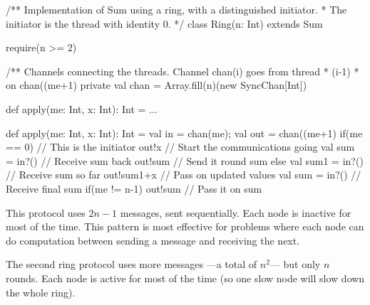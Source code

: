 \documentclass[notes,color]{sepslide0}
\begin{document}
\begin{slide}

\begin{scala}
/** Implementation of Sum using a ring, with a distinguished initiator.
  * The initiator is the thread with identity 0. */
class Ring(n: Int) extends Sum{
  require(n >= 2)

  /** Channels connecting the threads.  Channel chan(i) goes from thread
    * (i-1)%
    * on chan((me+1)%
  private val chan = Array.fill(n)(new SyncChan[Int])
 
  def apply(me: Int, x: Int): Int = ...
}
\end{scala}
\end{slide}


\begin{slide}

\begin{scala}
  def apply(me: Int, x: Int): Int = {
    val in = chan(me); val out = chan((me+1)%
    if(me == 0){                  // This is the initiator
      out!x                       // Start the communications going
      val sum = in?()             // Receive sum back
      out!sum                     // Send it round
      sum
    }
    else{
      val sum1 = in?()            // Receive sum so far
      out!sum1+x                  // Pass on updated values
      val sum = in?()             // Receive final sum
      if(me != n-1) out!sum   // Pass it on
      sum
    }
  } 
\end{scala}
\end{slide}



\begin{slide}

This protocol uses $2n-1$ messages, sent sequentially.  Each node is
inactive for most of the time.  This pattern is most effective for problems
where each node can do computation between sending a message and receiving the
next. 

The second ring protocol uses more messages ---a total of $n^2$--- but only
$n$ rounds.  Each node is active for most of the time (so one slow node will
slow down the whole ring).
\end{slide}

\end{document}
